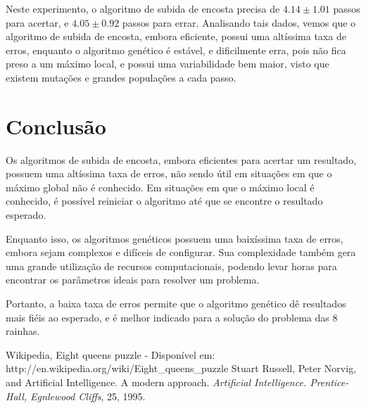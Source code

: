 \documentclass[conference]{IEEEtran}
\begin{document}
	Neste experimento, o algoritmo de subida de encosta precisa de $4.14 \pm 1.01$ passos para acertar, e $ 4.05 \pm 0.92$ passos para errar. Analisando tais dados, vemos que o algoritmo de subida de encosta, embora eficiente, possui uma altíssima taxa de erros, enquanto o algoritmo genético é estável, e dificilmente erra, pois não fica preso a um máximo local, e possui uma variabilidade bem maior, visto que existem mutações e grandes populações a cada passo.
	
	
	\section{Conclusão}
	Os algoritmos de subida de encosta, embora eficientes para acertar um resultado, possuem uma altíssima taxa de erros,
	não sendo útil em situações em que o máximo global não é conhecido. Em situações em que o máximo local é conhecido, é possível reiniciar o algoritmo até que se encontre o resultado esperado.
	
	Enquanto isso, os algoritmos genéticos possuem uma baixíssima taxa de erros, embora sejam complexos e difíceis de configurar. Sua complexidade também gera uma grande utilização de recursos computacionais, podendo levar horas para encontrar os parâmetros ideais para resolver um problema.
	
	Portanto, a baixa taxa de erros permite que o algoritmo genético dê resultados mais fiéis ao esperado, e é melhor indicado para a solução do problema das 8 rainhas.
	\begin{thebibliography}{2}
		Wikipedia, Eight queens puzzle - Disponível em: 
		http://en.wikipedia.org/wiki/Eight\_queens\_puzzle
		Stuart Russell, Peter Norvig, and Artificial Intelligence. A modern
		approach. \textit{Artificial Intelligence. Prentice-Hall, Egnlewood Cliffs}, 25,
		1995.
	\end{thebibliography}
	
\end{document}
